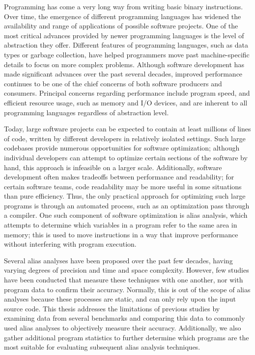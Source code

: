 Programming has come a very long way from writing basic binary instructions. Over time, the emergence of different programming languages has widened the availability and range of applications of possible software projects. One of the most critical advances provided by newer programming languages is the level of abstraction they offer. Different features of programming languages, such as data types or garbage collection, have helped programmers move past machine-specific details to focus on more complex problems. Although software development has made significant advances over the past several decades, improved performance continues to be one of the chief concerns of both software producers and consumers. Principal concerns regarding performance include program speed, and efficient resource usage, such as memory and I/O devices, and are inherent to all programming languages regardless of abstraction level.

Today, large software projects can be expected to contain at least millions of lines of code\cite{google}, written by different developers in relatively isolated settings. Such large codebases provide numerous opportunities for software optimization; although individual developers can attempt to optimize certain sections of the software by hand, this approach is infeasible on a larger scale. Additionally, software development often makes tradeoffs between performance and readability; for certain software teams, code readability may be more useful in some situations than pure efficiency. Thus, the only practical approach for optimizing such large programs is through an automated process, such as an optimization pass through a compiler. One such component of software optimization is alias analysis, which attempts to determine which variables in a program refer to the same area in memory; this is used to move instructions in a way that improve performance without interfering with program execution.

Several alias analyses have been proposed over the past few decades, having varying degrees of precision and time and space complexity. However, few studies have been conducted that measure these techniques with one another, nor with program data to confirm their accuracy. Normally, this is out of the scope of alias analyses because these processes are static, and can only rely upon the input source code. This thesis addresses the limitations of previous studies by examining data from several benchmarks and comparing this data to commonly used alias analyses to objectively measure their accuracy. Additionally, we also gather additional program statistics to further determine which programs are the most suitable for evaluating subsequent alias analysis techniques.
